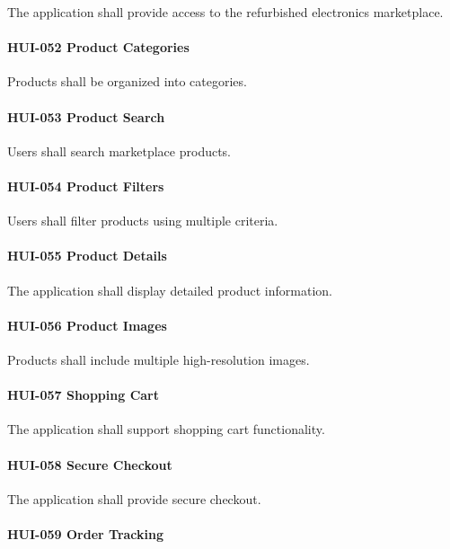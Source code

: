 The application shall provide access to the refurbished electronics
marketplace.

\paragraph{HUI-052 Product Categories}

Products shall be organized into categories.

\paragraph{HUI-053 Product Search}

Users shall search marketplace products.

\paragraph{HUI-054 Product Filters}

Users shall filter products using multiple criteria.

\paragraph{HUI-055 Product Details}

The application shall display detailed product information.

\paragraph{HUI-056 Product Images}

Products shall include multiple high-resolution images.

\paragraph{HUI-057 Shopping Cart}

The application shall support shopping cart functionality.

\paragraph{HUI-058 Secure Checkout}

The application shall provide secure checkout.

\paragraph{HUI-059 Order Tracking}


